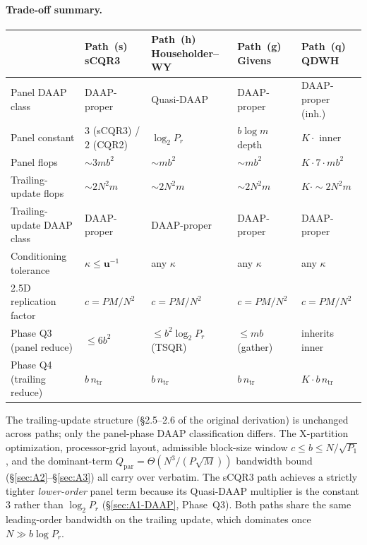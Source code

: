\documentclass[11pt]{article}
\begin{document}
\paragraph{Trade-off summary.}
\begin{center}
\renewcommand{\arraystretch}{1.1}
\begin{tabular}{l l l l l}
\toprule
                            & Path~(s) sCQR3 & Path~(h) Householder--WY & Path~(g) Givens & Path~(q) QDWH \\
\midrule
Panel DAAP class            & DAAP-proper          & Quasi-DAAP        & DAAP-proper        & DAAP-proper (inh.) \\
Panel constant              & $3$ (sCQR3) / $2$ (CQR2) & $\log_2 P_r$  & $b \log m$ depth   & $K \cdot$ inner \\
Panel flops                 & $\sim 3 m b^2$       & $\sim m b^2$      & $\sim m b^2$       & $K \cdot 7 \cdot m b^2$ \\
Trailing-update flops       & $\sim 2 N^2 m$       & $\sim 2 N^2 m$    & $\sim 2 N^2 m$     & $K \cdot \sim 2 N^2 m$ \\
Trailing-update DAAP class  & DAAP-proper          & DAAP-proper       & DAAP-proper        & DAAP-proper \\
Conditioning tolerance      & $\kappa \le \mathbf{u}^{-1}$ & any $\kappa$ & any $\kappa$    & any $\kappa$ \\
2.5D replication factor     & $c = PM/N^2$         & $c = PM/N^2$      & $c = PM/N^2$       & $c = PM/N^2$ \\
Phase Q3 (panel reduce)     & $\le 6 b^2$          & $\le b^2 \log_2 P_r$ (TSQR) & $\le m b$ (gather) & inherits inner \\
Phase Q4 (trailing reduce)  & $b\,n_{\text{tr}}$   & $b\,n_{\text{tr}}$ & $b\,n_{\text{tr}}$ & $K \cdot b\,n_{\text{tr}}$ \\
\bottomrule
\end{tabular}
\end{center}

The trailing-update structure (\S2.5--2.6 of the original derivation)
is unchanged across paths; only the panel-phase DAAP classification
differs. The X-partition optimization, processor-grid layout,
admissible block-size window $c \le b \le N/\sqrt{P_1}$, and the
dominant-term $Q_{\text{par}} = \Theta(N^3/(P\sqrt{M}))$ bandwidth
bound (\S\ref{sec:A2}--\S\ref{sec:A3}) all carry over verbatim. The
sCQR3 path achieves a strictly tighter \emph{lower-order} panel term
because its Quasi-DAAP multiplier is the constant $3$ rather than
$\log_2 P_r$ (\S\ref{sec:A1-DAAP}, Phase~Q3). Both paths share the
same leading-order bandwidth on the trailing update, which dominates
once $N \gg b \log P_r$.
\end{document}

